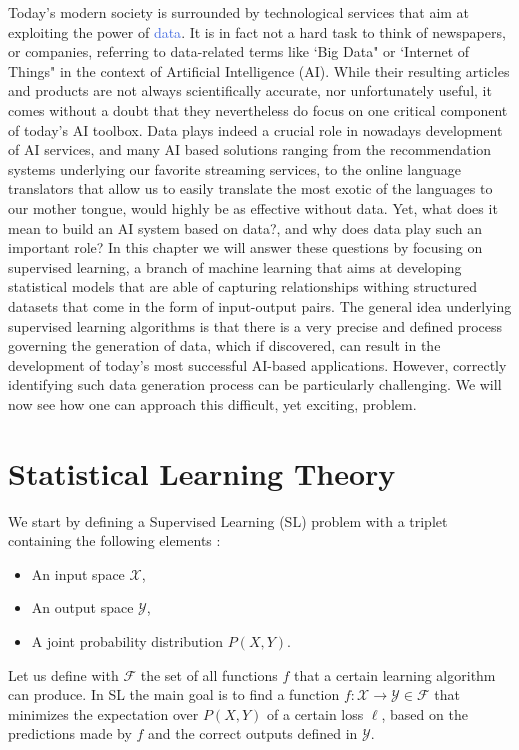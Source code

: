 Today's modern society is surrounded by technological services that aim at exploiting the power of \textcolor{RoyalBlue}{data}. It is in fact not a hard task to think of newspapers, or companies, referring to data-related terms like `Big Data" or `Internet of Things" in the context of Artificial Intelligence (AI). While their resulting articles and products are not always scientifically accurate, nor unfortunately useful, it comes without a doubt that they nevertheless do focus on one critical component of today's AI toolbox. Data plays indeed a crucial role in nowadays development of AI services, and many AI based solutions ranging from the recommendation systems underlying our favorite streaming services, to the online language translators that allow us to easily translate the most exotic of the languages to our mother tongue, would highly be as effective without data. Yet, what does it mean to build an AI system based on data?, and why does data play such an important role? In this chapter we will answer these questions by focusing on supervised learning, a branch of machine learning that aims at developing statistical models that are able of capturing relationships withing structured datasets that come in the form of input-output pairs. The general idea underlying supervised learning algorithms is that there is a very precise and defined process governing the generation of data, which if discovered, can result in the development of today's most successful AI-based applications. However, correctly identifying such data generation process can be particularly challenging. We will now see how one can approach this difficult, yet exciting, problem.    

\section{Statistical Learning Theory}
\label{sec:learning_from_data}

We start by defining a Supervised Learning (SL) problem with a triplet containing the following elements \cite{friedman2001elements, louppe2014understanding}:
\begin{itemize}
	\item An input space $\mathcal{X}$,
	\item An output space $\mathcal{Y}$,
	\item A joint probability distribution $P(X,Y)$.
\end{itemize}
Let us define with $\mathcal{F}$ the set of all functions $f$ that a certain learning algorithm can produce. In SL the main goal is to find a function $f:\mathcal{X}\rightarrow\mathcal{Y} \in \mathcal{F}$ that minimizes the expectation over $P(X,Y)$ of a certain loss $\ell$, based on the predictions made by $f$ and the correct outputs defined in $\mathcal{Y}$.

